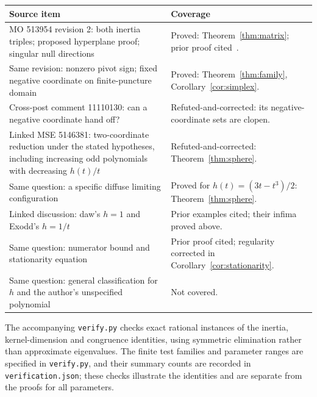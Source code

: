 \documentclass[11pt]{article}
\begin{document}
\begin{center}\small
\begin{tabularx}{\linewidth}{@{}>{\raggedright\arraybackslash}p{.53\linewidth}>{\raggedright\arraybackslash}X@{}}
\toprule
Source item & Coverage\\
\midrule
MO 513954 revision 2: both inertia triples; proposed hyperplane proof;
singular null directions
 & Proved: Theorem~\ref{thm:matrix}; prior proof cited~\cite{user1551}.\\
Same revision: nonzero pivot sign; fixed negative coordinate on finite-puncture domain
 & Proved: Theorem~\ref{thm:family}, Corollary~\ref{cor:simplex}.\\
Cross-post comment 11110130: can a negative coordinate hand off?
 & Refuted-and-corrected: its negative-coordinate sets are clopen.\\
Linked MSE 5146381: two-coordinate reduction under the stated hypotheses,
including increasing odd polynomials with decreasing $h(t)/t$
 & Refuted-and-corrected: Theorem~\ref{thm:sphere}.\\
Same question: a specific diffuse limiting configuration
 & Proved for $h(t)=(3t-t^3)/2$: Theorem~\ref{thm:sphere}.\\
Linked discussion: daw's $h=1$ and Exodd's $h=1/t$
 & Prior examples cited; their infima proved above.\\
Same question: numerator bound and stationarity equation
 & Prior proof cited; regularity corrected in Corollary~\ref{cor:stationarity}.\\
Same question: general classification for $h$ and the author's unspecified polynomial
 & Not covered.\\
\bottomrule
\end{tabularx}
\end{center}
The accompanying \texttt{verify.py} checks exact rational instances of the
inertia, kernel-dimension and congruence identities, using symmetric
elimination rather than approximate eigenvalues. The finite test families
and parameter ranges are specified in \texttt{verify.py}, and their summary
counts are recorded in \texttt{verification.json}; these checks illustrate
the identities and are separate from the proofs for all parameters.
\end{document}
